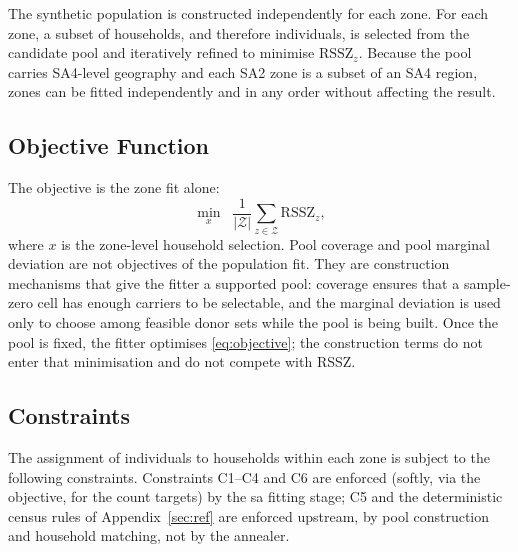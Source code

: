 The synthetic population is constructed independently for each zone. For each zone, a subset of households, and therefore individuals, is selected from the candidate pool and iteratively refined to minimise \( \text{RSSZ}_z \). Because the pool carries SA4-level geography and each SA2 zone is a subset of an SA4 region, zones can be fitted independently and in any order without affecting the result.



\subsection*{Objective Function}
The objective is the zone fit alone:
\begin{equation}
\min_{x}\;\; \frac{1}{|\mathcal{Z}|}\sum_{z\in\mathcal{Z}}
\text{RSSZ}_z,
\label{eq:objective}
\end{equation}
where \(x\) is the zone-level household selection. Pool coverage and pool marginal
deviation are not objectives of the population fit. They are construction
mechanisms that give the fitter a supported pool: coverage ensures that a
sample-zero cell has enough carriers to be selectable, and the marginal
deviation is used only to choose among feasible donor sets while the pool is
being built. Once the pool is fixed, the fitter optimises \eqref{eq:objective};
the construction terms do not enter that minimisation and do not compete with
RSSZ.

\subsection*{Constraints}
The assignment of individuals to households within each zone is subject to the following constraints. Constraints C1--C4 and C6 are enforced (softly, via the objective, for the count targets) by the \gls{sa} fitting stage; C5 and the deterministic census rules of Appendix~\ref{sec:ref} are enforced upstream, by pool construction and household matching, not by the annealer.

